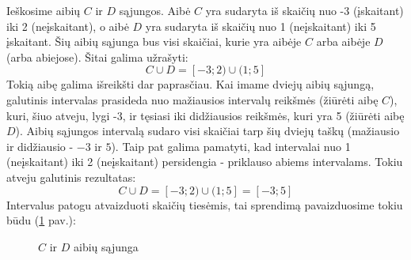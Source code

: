 \documentclass[a4paper]{article}
\begin{document}
Ieškosime aibių $C$ ir $D$ sąjungos. Aibė $C$ yra sudaryta iš skaičių nuo -3
(įskaitant) iki 2 (neįskaitant), o aibė $D$ yra sudaryta iš skaičių nuo 1
(neįskaitant) iki 5 įskaitant. Šių aibių sąjunga bus visi skaičiai, kurie yra
aibėje $C$ arba aibėje $D$ (arba abiejose). Šitai galima užrašyti:
\[  C \cup D = [-3;2) \cup (1;5] \]
Tokią aibę galima išreikšti dar paprasčiau. Kai imame dviejų aibių sąjungą,
galutinis intervalas prasideda nuo mažiausios intervalų reikšmės (žiūrėti aibę
$C$), kuri, šiuo atveju, lygi -3, ir tęsiasi iki didžiausios reikšmės, kuri yra
5 (žiūrėti aibę $D$). Aibių sąjungos intervalą sudaro visi skaičiai tarp šių
dviejų taškų (mažiausio ir didžiausio - $-3$ ir $5$). Taip pat galima pamatyti,
kad intervalai nuo 1 (neįskaitant) iki 2 (neįskaitant) persidengia - priklauso
abiems intervalams. Tokiu atveju galutinis rezultatas:
\[  C \cup D = [-3;2) \cup (1;5] = [-3;5] \]
Intervalus patogu atvaizduoti skaičių tiesėmis, tai sprendimą pavaizduosime
tokiu būdu (\ref{fig:set_union_example_interval} pav.):

\begin{figure}[!htbp]
      \centering
      \caption{$C$ ir $D$ aibių sąjunga} \label{fig:set_union_example_interval}
\end{figure}
\end{document}
